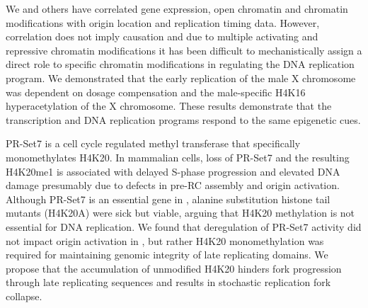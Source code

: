 We and others have correlated gene expression, open chromatin and chromatin modifications with origin location and replication timing data\citep{Rhind2013-yr}.  However, correlation does not  imply causation and due to multiple activating and repressive chromatin modifications it has been difficult to mechanistically assign a direct role to specific chromatin modifications in regulating the DNA replication program. We demonstrated that the early replication of the \dros male X chromosome was dependent on dosage compensation and the male-specific H4K16 hyperacetylation of the X chromosome\citep{Lubelsky2014-zn}.  These results demonstrate that the transcription and DNA replication programs respond to the same epigenetic cues.

PR-Set7 is a cell cycle regulated methyl transferase that specifically monomethylates H4K20\citep{Beck2012-uc}.  In mammalian cells, loss of PR-Set7 and the resulting H4K20me1 is associated with delayed S-phase progression and elevated DNA damage presumably due to defects in pre-RC assembly and origin activation\citep{Tardat2010-qc}.  %
Although PR-Set7 is an essential gene in \dros, alanine substitution histone tail mutants (H4K20A) were sick but viable\citep{McKay2015-nn}, arguing that H4K20 methylation is not essential for DNA replication. We found that deregulation of PR-Set7 activity did not impact origin activation in \dros, but rather H4K20 monomethylation was required for maintaining genomic integrity of late replicating domains\citep{Li2016-fi}.  We propose that the accumulation of unmodified H4K20 hinders fork progression through late replicating sequences and results in stochastic replication fork collapse.


